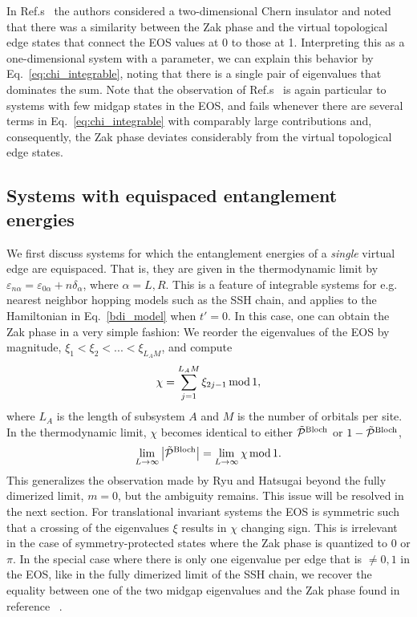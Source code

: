 \documentclass[twocolumn,amsmath,longbibliography,amssymb,superscriptaddress]{revtex4-1}
\begin{document}
In Ref.s~\cite{Huang2012,Huang2012-2} the authors considered a two-dimensional Chern insulator and noted that there was a similarity between the Zak phase and the virtual topological edge states that connect the EOS values at 0 to those at 1. 
Interpreting this as a one-dimensional system with a parameter, we can explain this behavior by Eq.~\eqref{eq:chi_integrable}, noting that there is a single pair of eigenvalues that dominates the sum. 
Note that the observation of Ref.s~\cite{Huang2012,Huang2012-2} is again particular to systems with few midgap states in the EOS, and fails whenever there are several terms in Eq.~\eqref{eq:chi_integrable} with comparably large contributions and, consequently, the Zak phase deviates considerably from the virtual topological edge states.


\subsection{Systems with equispaced entanglement energies}

We first discuss systems for which the entanglement energies of a \emph{single} virtual edge are equispaced. That is, they are given in the thermodynamic limit by $\varepsilon_{n\alpha} = \varepsilon_{0\alpha}+n\delta_\alpha$, where $\alpha = L,R$. This is a feature of integrable systems \cite{Peschel1999} for e.g. nearest neighbor hopping models such as the SSH chain, and applies to the Hamiltonian in Eq.~\eqref{bdi_model} when $t'=0$. 
In this case, one can obtain the Zak phase in a very simple fashion: We reorder the eigenvalues of the EOS by magnitude, $\xi_1 < \xi_2 < ...< \xi_{L_AM}$, and compute
\begin{equation}
\chi = \sum_{j=1}^{L_A M} \xi_{2j-1} \, {\rm mod} \, 1,
\label{eq:chi_integrable}
\end{equation}
where $L_A$ is the length of subsystem $A$ and $M$ is the number of orbitals per site. In the thermodynamic limit, $\chi$ becomes identical to either $\tilde{\mathcal{P}}^{\rm Bloch}$ or $1-\tilde{\mathcal{P}}^{\rm Bloch}$, 
\begin{equation}
\lim_{L \rightarrow \infty} \abs{\tilde{\mathcal{P}}^{\rm Bloch}} = \lim_{L \rightarrow \infty} \chi \, {\rm mod} \, 1.
\end{equation}
This generalizes the observation made by Ryu and Hatsugai \cite{Ryu2006} beyond the fully dimerized limit, $m=0$, but the ambiguity remains. This issue will be resolved in the next section. 
For translational invariant systems the EOS is symmetric such that a crossing of the eigenvalues $\xi$ results in $\chi$ changing sign. This is irrelevant in the case of symmetry-protected states where the Zak phase is quantized to $0$ or $\pi$. 
In the special case where there is only one eigenvalue per edge that is $\neq 0,1$ in  the EOS, like in the fully dimerized limit of the SSH chain, we recover the equality between one of the two midgap eigenvalues and the Zak phase found in reference ~\cite{Ryu2006}. 
\end{document}
